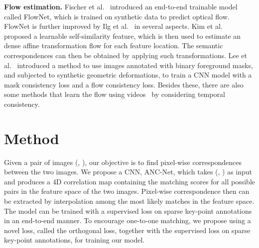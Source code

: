 \documentclass[10pt,twocolumn,letterpaper]{article}
\begin{document}
\noindent
\textbf{Flow estimation.}
Fischer et al.~\cite{fischer2015flownet} introduced an end-to-end trainable model called FlowNet, which is trained on synthetic data to predict optical flow.
FlowNet is further improved by Ilg et al.~\cite{IMSKDB17} in several aspects. 
Kim et al.~\cite{Kim_CVPR17_FCSS} proposed a learnable self-similarity feature, which is then used to estimate an dense affine transformation flow for each feature location.
The semantic correspondences can then be obtained by applying such transformations.
Lee et al.~\cite{Lee19} introduced a method to use images annotated with binary foreground masks, and subjected to synthetic geometric deformations, to train a CNN model with a mask consistency loss and a flow consistency loss.
Besides these, there are also some methods that learn the flow using videos~\cite{Wang_cvpr19_learning,Lai_BMVC19} by considering temporal consistency. 













 \section{Method}
Given a pair of images (, ), our objective is to find pixel-wise correspondences between the two images.
We propose a CNN, ANC-Net, which takes (, ) as input and produces a 4D correlation map containing the matching scores for all possible pairs in the feature space of the two images.
Pixel-wise correspondence then can be extracted by interpolation among the most likely matches in the feature space.
The model can be trained with a supervised loss on sparse key-point annotations in an end-to-end manner.
To encourage one-to-one matching, we propose using a novel loss, called the orthogonal loss, together with the supervised loss on sparse key-point annotations, for training our model. 
\end{document}
